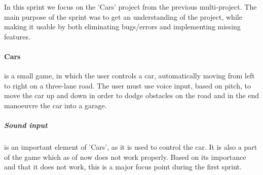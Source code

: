 In this sprint we focus on the 'Cars' project from the previous multi-project.
The main purpose of the sprint was to get an understanding of the project, while making it usable by both eliminating bugs/errors and implementing missing features.

\paragraph{Cars} is a small game, in which the user controls a car, automatically moving from left to right on a three-lane road.
The user must use voice input, based on pitch, to move the car up and down in order to dodge obstacles on the road and in the end manoeuvre the car into a garage.

\subparagraph{Sound input} is an important element of 'Cars', as it is used to control the car.
It is also a part of the game which as of now does not work properly.
Based on its importance and that it does not work, this is a major focus point during the first sprint.